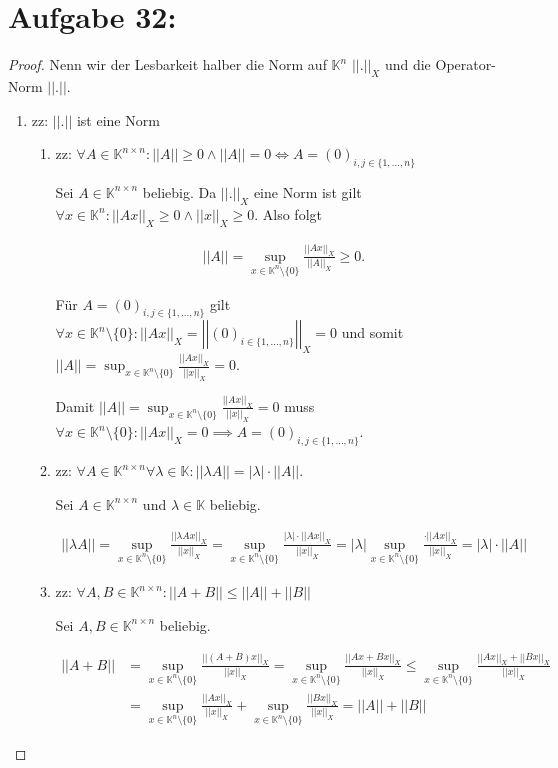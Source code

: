 \documentclass[]{article}
\newcommand{\norm}[1]{\left|\left|#1\right|\right|}
\newcommand{\normx}[1]{\norm{#1}_X}
\newcommand{\Azero}{(0)_{i,j \in \{1,...,n\}}}
\newcommand{\supn}{\sup_{x \in \mathbb{K}^n\setminus\{0\}}}
\begin{document}
\section{Aufgabe 32:}
\begin{proof}
	Nenn wir der Lesbarkeit halber die Norm auf $\mathbb{K}^n$ $\normx{.}$ und die Operator-Norm $\norm{.}$.
	
	\begin{enumerate}[label=\alph*)]
		\item zz: $\norm{.}$ ist eine Norm
		\begin{enumerate}[label=(N\arabic*)]
			\item zz: $\forall A \in \mathbb{K}^{n \times n}: \norm{A}\geq 0 \land \norm{A}=0 \iff A=\Azero$
			
			Sei $A \in \mathbb{K}^{n \times n}$ beliebig. Da $\normx{.}$ eine Norm ist gilt $\forall x \in \mathbb{K}^n: \normx{Ax} \geq 0 \land \normx{x} \geq 0$. Also folgt
			
			\begin{align*}
				\norm{A}=\supn\frac{\normx{Ax}}{\normx{A}}\geq 0.
			\end{align*}
		
			Für $A=\Azero$ gilt $\forall x \in \mathbb{K}^n\setminus\{0\}: \normx{Ax} = \normx{(0)_{i\in\{1,...,n\}}} = 0$ und somit $\norm{A}=\supn\frac{\normx{Ax}}{\normx{x}}=0$.
			
			Damit $\norm{A}=\supn\frac{\normx{Ax}}{\normx{x}}=0$ muss $\forall x \in \mathbb{K}^n\setminus\{0\}: \normx{Ax} = 0 \implies A = \Azero$.
			
			\item zz: $\forall A \in \mathbb{K}^{n\times n} \forall \lambda \in \mathbb{K}: \norm{\lambda A} = |\lambda|\cdot\norm{A}$.
			
			Sei $A \in \mathbb{K}^{n \times n}$ und $\lambda \in \mathbb{K}$  beliebig.
			
			\begin{align*}
				\norm{\lambda A} = \supn\frac{\normx{\lambda Ax}}{\normx{x}} = \supn\frac{|\lambda|\cdot\normx{Ax}}{\normx{x}} = |\lambda| \supn\frac{\cdot\normx{Ax}}{\normx{x}} = |\lambda|\cdot \norm{A}
			\end{align*}
		
			\item zz: $\forall A, B \in \mathbb{K}^{n \times n}: \norm{A+B}\leq \norm{A}+\norm{B}$
			
			Sei $A, B \in \mathbb{K}^{n \times n}$ beliebig.
			
			\begin{align*}
				\norm{A+B} &= \supn\frac{\normx{(A+B)x}}{\normx{x}} = \supn\frac{\normx{Ax+Bx}}{\normx{x}} \leq \supn\frac{\normx{Ax}+\normx{Bx}}{\normx{x}}\\
				&= \supn\frac{\normx{Ax}}{\normx{x}} + \supn\frac{\normx{Bx}}{\normx{x}} = \norm{A} + \norm{B}
			\end{align*}
		\end{enumerate}
	

\end{enumerate}
\end{proof}
\end{document}

